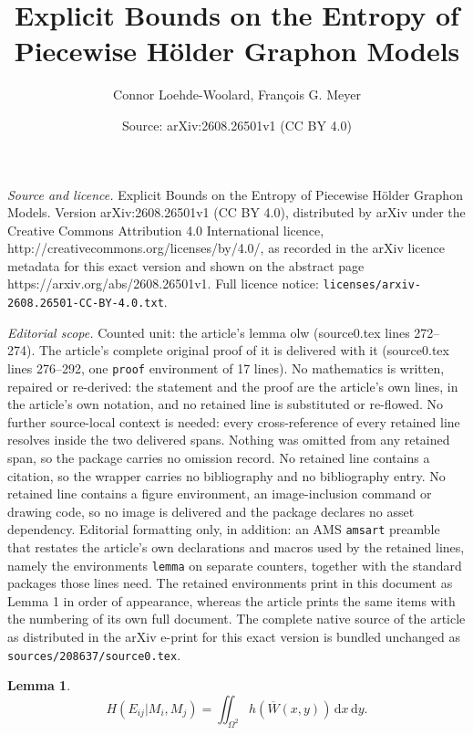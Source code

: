 \documentclass[10pt,a4paper]{amsart}
\title{Explicit Bounds on the Entropy of Piecewise H\"{o}lder Graphon Models}
\author{Connor Loehde-Woolard, Fran\c{c}ois G. Meyer}
\date{Source: arXiv:2608.26501v1 (CC BY 4.0)}
\newtheorem{lemma}{Lemma}
\newcommand{\K}{\Omega}
\newcommand{\dd}{\,\mathrm{d}}
\newcommand{\ol}[1]{\overline{#1}}
\begin{document}
\maketitle

\noindent\emph{Source and licence.} Explicit Bounds on the Entropy of Piecewise H\"{o}lder Graphon Models. Version arXiv:2608.26501v1 (CC BY 4.0), distributed by arXiv under the Creative Commons Attribution 4.0 International licence, http://creativecommons.org/licenses/by/4.0/, as recorded in the arXiv licence metadata for this exact version and shown on the abstract page https://arxiv.org/abs/2608.26501v1. Full licence notice: \texttt{licenses/arxiv-2608.26501-CC-BY-4.0.txt}.\par\smallskip

\noindent\textit{Editorial scope.} Counted unit: the article's lemma olw (source0.tex lines 272--274). The article's complete original proof of it is delivered with it (source0.tex lines 276--292, one \texttt{proof} environment of 17 lines). No mathematics is written, repaired or re-derived: the statement and the proof are the article's own lines, in the article's own notation, and no retained line is substituted or re-flowed.  No further source-local context is needed: every cross-reference of every retained line resolves inside the two delivered spans.  Nothing was omitted from any retained span, so the package carries no omission record.  No retained line contains a citation, so the wrapper carries no bibliography and no bibliography entry.  No retained line contains a figure environment, an image-inclusion command or drawing code, so no image is delivered and the package declares no asset dependency.  Editorial formatting only, in addition: an AMS \texttt{amsart} preamble that restates the article's own declarations and macros used by the retained lines, namely the environments \texttt{lemma} on separate counters, together with the standard packages those lines need.  The retained environments print in this document as Lemma 1 in order of appearance, whereas the article prints the same items with the numbering of its own full document.  The complete native source of the article as distributed in the arXiv e-print for this exact version is bundled unchanged as \texttt{sources/208637/source0.tex}.
\begin{lemma}\label{olw}
\[H(E_{ij}|M_i,M_j) = \iint_{\K^2}h(\ol{W}(x,y))\dd x\dd y.\]
\end{lemma}
\end{document}
